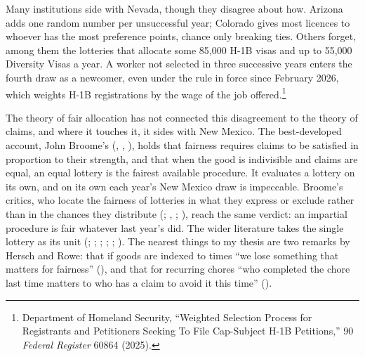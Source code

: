 \documentclass[
  11pt,
  letterpaper,
  DIV=11,
  numbers=noendperiod,
  twoside]{scrartcl}
\begin{document}
Many institutions side with Nevada, though they disagree about how.
Arizona adds one random number per unsuccessful year; Colorado gives
most licences to whoever has the most preference points, chance only
breaking ties. Others forget, among them the lotteries that allocate
some 85,000 H-1B visas and up to 55,000 Diversity Visas a year. A worker
not selected in three successive years enters the fourth draw as a
newcomer, even under the rule in force since February 2026, which
weights H-1B registrations by the wage of the job offered.\footnote{Department
  of Homeland Security, ``Weighted Selection Process for Registrants and
  Petitioners Seeking To File Cap-Subject H-1B Petitions,'' 90
  \emph{Federal Register} 60864 (2025).}

The theory of fair allocation has not connected this disagreement to the
theory of claims, and where it touches it, it sides with New Mexico. The
best-developed account, John Broome's (,
, ),
holds that fairness requires claims to be satisfied in proportion to
their strength, and that when the good is indivisible and claims are
equal, an equal lottery is the fairest available procedure. It evaluates
a lottery on its own, and on its own each year's New Mexico draw is
impeccable. Broome's critics, who locate the fairness of lotteries in
what they express or exclude rather than in the chances they distribute
(;
, ;
), reach the same
verdict: an impartial procedure is fair whatever last year's did. The
wider literature takes the single lottery as its unit
(;
;
;
;
;
). The nearest things to my thesis
are two remarks by Hersch and Rowe: that if goods are indexed to times
``we lose something that matters for fairness''
(), and that for recurring
chores ``who completed the chore last time matters to who has a claim to
avoid it this time'' ().
\end{document}
